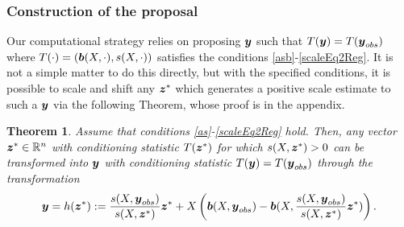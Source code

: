 \documentclass[ba]{imsart}
\newcommand{\by}{\mbox{\boldmath $y$}}
\newcommand{\bz}{\mbox{\boldmath $z$}}
\newcommand{\bb}{\mbox{\boldmath $b$}}
\newtheorem{theorem}{Theorem}[section]
\begin{document}
\subsubsection{Construction of the proposal}
Our computational strategy relies on proposing $\by$ such that $T(\by) = T(\by_{obs})$ where $T(\cdot) = (\bb(X, \cdot), s(X, \cdot))$ satisfies the conditions \ref{asb}-\ref{scaleEq2Reg}. It is not a simple matter to do this directly, but with the specified conditions, it is possible to scale and shift any $\bz^{*}$ which generates 
a positive scale estimate to such a $\by$ via the following Theorem, whose proof is in the appendix. 
\begin{theorem}
\label{Transformation}
Assume that conditions \ref{as}-\ref{scaleEq2Reg} hold.  Then, any vector $\bz^* \in \mathbb{R}^n$ with conditioning statistic
$T(\bz^*)$ for which $s(X,\bz^*) > 0$ can be transformed into $\by$ with conditioning statistic $T(\by) = T(\by_{obs})$ 
through the transformation 
\[
\by = h(\bz^*) := \frac{s(X,\by_{obs})}{s(X,\bz^*)} \bz^* + X\left(\bb(X,\by_{obs}) - \bb(X,\frac{s(X,\by_{obs})}{s(X,\bz^*)} \bz^*)\right) .  
\]
\end{theorem}%
\end{document}
